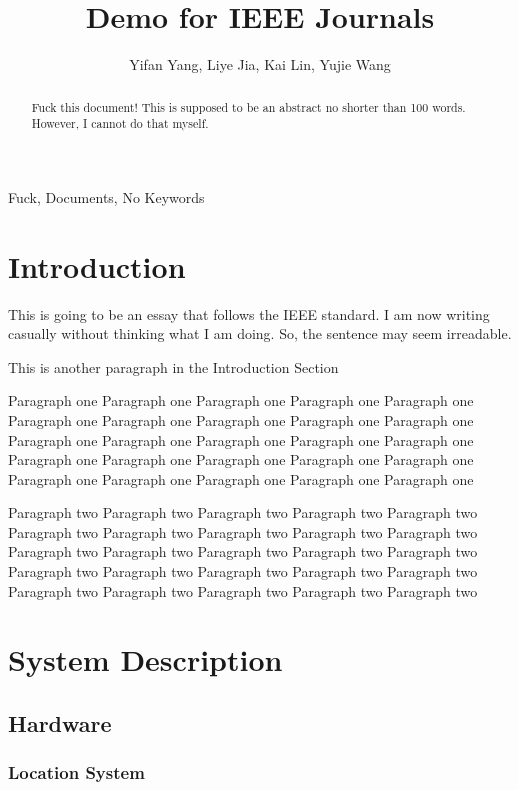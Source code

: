 \documentclass[10pt,journal,final,a4paper,nofonttune]{IEEEtran}
\title{Demo for IEEE Journals}
\author{Yifan Yang, Liye Jia, Kai Lin, Yujie Wang}
\begin{document}
\maketitle

\begin{abstract}
    Fuck this document! This is supposed to be an abstract no shorter 
    than 100 words. However, I cannot do that myself.
\end{abstract}

\begin{IEEEkeywords}
    Fuck, Documents, No Keywords
\end{IEEEkeywords}


\section{Introduction}
This is going to be an essay that follows the IEEE standard.
I am now writing casually without thinking what I am doing. So, the 
sentence may seem irreadable.
\cite{gomez2012overview}

This is another paragraph in the Introduction Section

Paragraph one Paragraph one Paragraph one Paragraph one Paragraph one 
Paragraph one Paragraph one Paragraph one Paragraph one Paragraph one 
Paragraph one Paragraph one Paragraph one Paragraph one Paragraph one 
Paragraph one Paragraph one Paragraph one Paragraph one Paragraph one 
Paragraph one Paragraph one Paragraph one Paragraph one Paragraph one 

Paragraph two Paragraph two Paragraph two Paragraph two Paragraph two 
Paragraph two Paragraph two Paragraph two Paragraph two Paragraph two 
Paragraph two Paragraph two Paragraph two Paragraph two Paragraph two 
Paragraph two Paragraph two Paragraph two Paragraph two Paragraph two 
Paragraph two Paragraph two Paragraph two Paragraph two Paragraph two 


\section{System Description}

\subsection{Hardware}

\subsubsection{Location System}
\end{document}
